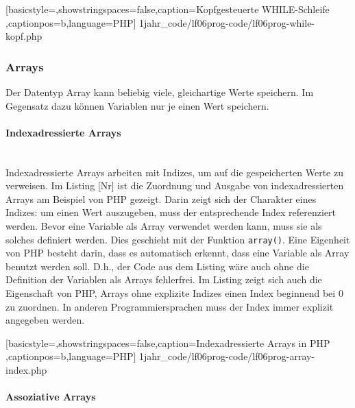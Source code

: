 
	[basicstyle=\small,showstringspaces=false,caption={Kopfgesteuerte WHILE-Schleife}
	\label{lst:while-kopf},captionpos=b,language=PHP]
	{1jahr_code/lf06prog-code/lf06prog-while-kopf.php}

\subsubsection{Arrays}

Der Datentyp Array kann beliebig viele, gleichartige Werte speichern. Im Gegensatz dazu können Variablen nur je einen Wert speichern. 

\paragraph{Indexadressierte Arrays}~\\

Indexadressierte Arrays arbeiten mit Indizes, um auf die gespeicherten Werte zu verweisen. Im Listing [Nr] ist die Zuordnung und Ausgabe von indexadressierten Arrays am Beispiel von PHP gezeigt. Darin zeigt sich der Charakter eines Indizes: um einen Wert auszugeben, muss der entsprechende Index referenziert werden. Bevor eine Variable als Array verwendet werden kann, muss sie als solches definiert werden. Dies geschieht mit der Funktion \texttt{array()}. Eine Eigenheit von PHP besteht darin, dass es automatisch erkennt, dass eine Variable als Array benutzt werden soll. D.h., der Code aus dem Listing wäre auch ohne die Definition der Variablen als Arrays fehlerfrei. Im Listing zeigt sich auch die Eigenschaft von PHP, Arrays ohne explizite Indizes einen Index beginnend bei $0$ zu zuordnen. In anderen Programmiersprachen muss der Index immer explizit angegeben werden.


	[basicstyle=\small,showstringspaces=false,caption={Indexadressierte Arrays in PHP}
	\label{lst:array-index},captionpos=b,language=PHP]
	{1jahr_code/lf06prog-code/lf06prog-array-index.php}

\paragraph{Assoziative Arrays}~\\


